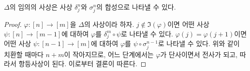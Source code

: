 \begin{lemma}
\label{lemma-face-degeneracy}
$\Delta$의 임의의 사상은 사상 $\delta^n_j$와 $\sigma^n_j$의 합성으로 나타낼 수 있다.
\end{lemma}

\begin{proof}
$\varphi : [n] \to [m]$을 $\Delta$의 사상이라 하자.
$j \not \in \Im(\varphi)$이면 어떤 사상
$\psi : [n] \to [m - 1]$에 대하여 $\varphi$를
$\delta^m_j \circ \psi$로 나타낼 수 있다. $\varphi(j) = \varphi(j + 1)$이면
어떤 사상 $\psi : [n - 1] \to [m]$에 대하여 $\varphi$를
$\psi \circ \sigma^{n - 1}_j$로 나타낼 수 있다.
위와 같이 치환할 때마다 $n + m$이 작아지므로, 어느 단계에서는
$\varphi$가 단사이면서 전사가 되고, 따라서 항등사상이 된다.
이로부터 결론이 따른다.
\end{proof}

